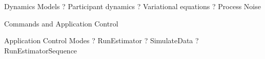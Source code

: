 %

Dynamics Models ?   Participant dynamics ?   Variational equations ?
Process Noise

Commands and Application Control

Application Control Modes ?   RunEstimator ?   SimulateData ?
RunEstimatorSequence
